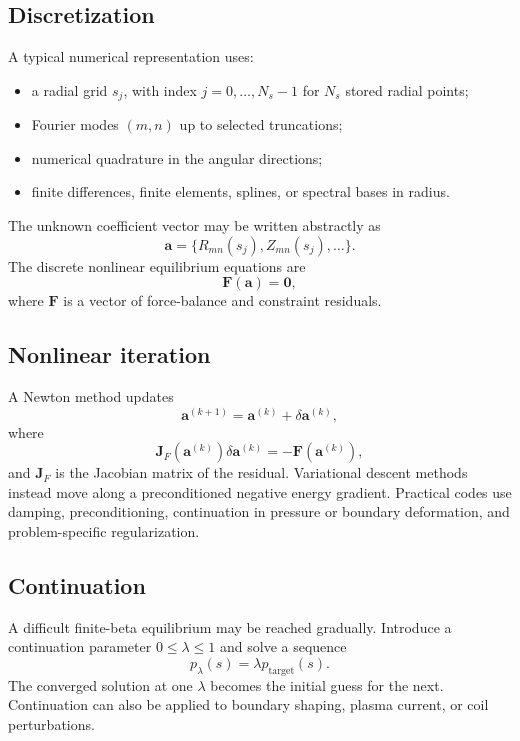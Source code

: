 \subsection{Discretization}
A typical numerical representation uses:
\begin{itemize}[leftmargin=1.6em]
\item a radial grid $s_j$, with index $j=0,\ldots,N_s-1$ for $N_s$ stored radial points;
\item Fourier modes $(m,n)$ up to selected truncations;
\item numerical quadrature in the angular directions;
\item finite differences, finite elements, splines, or spectral bases in radius.
\end{itemize}
The unknown coefficient vector may be written abstractly as
\begin{equation}
\mathbf a=
\{R_{mn}(s_j),Z_{mn}(s_j),\ldots\}.
\end{equation}
The discrete nonlinear equilibrium equations are
\begin{equation}
\mathbf F(\mathbf a)=\mathbf 0,
\label{eq:nonlinear_equilibrium_discrete}
\end{equation}
where $\mathbf F$ is a vector of force-balance and constraint residuals.

\subsection{Nonlinear iteration}
A Newton method updates
\begin{equation}
\mathbf a^{(k+1)}
=\mathbf a^{(k)}+\delta\mathbf a^{(k)},
\end{equation}
where
\begin{equation}
\mathbf J_F(\mathbf a^{(k)})\delta\mathbf a^{(k)}
=-\mathbf F(\mathbf a^{(k)}),
\end{equation}
and $\mathbf J_F$ is the Jacobian matrix of the residual. Variational descent methods instead move along a preconditioned negative energy gradient. Practical codes use damping, preconditioning, continuation in pressure or boundary deformation, and problem-specific regularization.

\subsection{Continuation}
A difficult finite-beta equilibrium may be reached gradually. Introduce a continuation parameter $0\leq\lambda\leq1$ and solve a sequence
\begin{equation}
p_\lambda(s)=\lambda p_{\mathrm{target}}(s).
\end{equation}
The converged solution at one $\lambda$ becomes the initial guess for the next. Continuation can also be applied to boundary shaping, plasma current, or coil perturbations.

